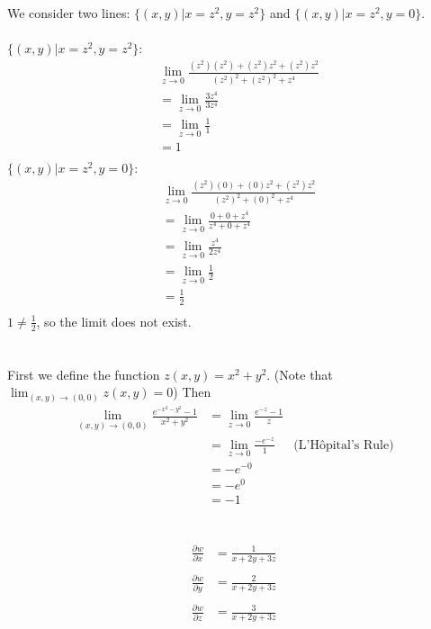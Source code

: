 \documentclass{article}
\begin{document}
\section{} %
	We consider two lines: $\{(x,y)|x=z^2,y=z^2\}$ and $\{(x,y)|x=z^2,y=0\}$.\\\\
	$\{(x,y)|x=z^2,y=z^2\}$:
	\begin{align*}
		&\lim_{z\to0}\frac{(z^2)(z^2)+(z^2)z^2+(z^2)z^2}{{(z^2)}^2+{(z^2)}^2+z^4}\\
		&=\lim_{z\to0}\frac{3z^4}{3z^4}\\
		&=\lim_{z\to0}\frac{1}{1}\\
		&=1\\
	\end{align*}
	$\{(x,y)|x=z^2,y=0\}$:
	\begin{align*}
		&\lim_{z\to0}\frac{(z^2)(0)+(0)z^2+(z^2)z^2}{{(z^2)}^2+{(0)}^2+z^4}\\
		&=\lim_{z\to0}\frac{0+0+z^4}{z^4+0+z^4}\\
		&=\lim_{z\to0}\frac{z^4}{2z^4}\\
		&=\lim_{z\to0}\frac{1}{2}\\
		&=\frac{1}{2}\\
	\end{align*}
	$1\neq\frac{1}{2}$, so the limit does not exist.
\section{} %
	First we define the function $z(x,y)=x^2+y^2$. (Note that $\lim_{(x,y)\to(0,0)}z(x,y)=0$) Then
	\begin{align*}
		\lim_{(x,y)\to(0,0)}\frac{e^{-x^2-y^2}-1}{x^2+y^2}&=\lim_{z\to0}\frac{e^{-z}-1}{z}\\
		&=\lim_{z\to0}\frac{-e^{-z}}{1}&\text{(L'H\^{o}pital's Rule)}\\
		&=-e^{-0}\\
		&=-e^0\\
		&=-1
	\end{align*}
\section{} %
	\begin{align*}
		\frac{\partial{w}}{\partial{x}}&=\frac{1}{x+2y+3z}\\\\
		\frac{\partial{w}}{\partial{y}}&=\frac{2}{x+2y+3z}\\\\
		\frac{\partial{w}}{\partial{z}}&=\frac{3}{x+2y+3z}
	\end{align*}
\end{document}
